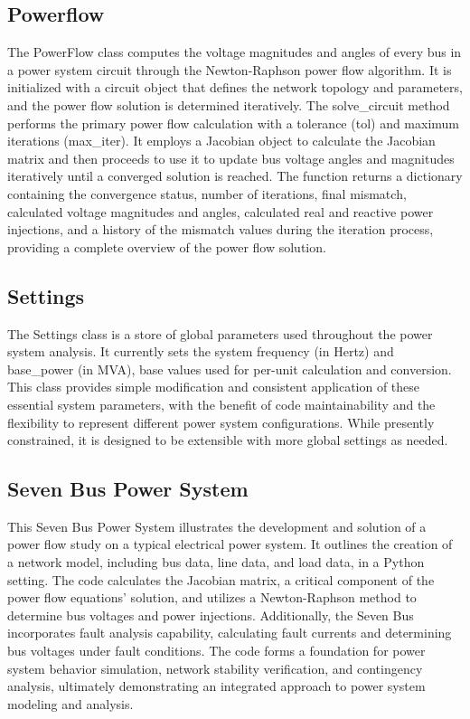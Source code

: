 \documentclass{article}
\begin{document}
	\subsection{Powerflow}
	The PowerFlow class computes the voltage magnitudes and angles of every bus in a power system circuit through the Newton-Raphson power flow algorithm. It is initialized with a circuit object that defines the network topology and parameters, and the power flow solution is determined iteratively. The solve\_circuit method performs the primary power flow calculation with a tolerance (tol) and maximum iterations (max\_iter). It employs a Jacobian object to calculate the Jacobian matrix and then proceeds to use it to update bus voltage angles and magnitudes iteratively until a converged solution is reached. The function returns a dictionary containing the convergence status, number of iterations, final mismatch, calculated voltage magnitudes and angles, calculated real and reactive power injections, and a history of the mismatch values during the iteration process, providing a complete overview of the power flow solution.
	
	\subsection{Settings}
	The Settings class is a store of global parameters used throughout the power system analysis. It currently sets the system frequency (in Hertz) and base\_power (in MVA), base values used for per-unit calculation and conversion. This class provides simple modification and consistent application of these essential system parameters, with the benefit of code maintainability and the flexibility to represent different power system configurations. While presently constrained, it is designed to be extensible with more global settings as needed.
	
	\subsection{Seven Bus Power System}
	This Seven Bus Power System illustrates the development and solution of a power flow study on a typical electrical power system. It outlines the creation of a network model, including bus data, line data, and load data, in a Python setting. The code calculates the Jacobian matrix, a critical component of the power flow equations' solution, and utilizes a Newton-Raphson method to determine bus voltages and power injections. Additionally, the Seven Bus incorporates fault analysis capability, calculating fault currents and determining bus voltages under fault conditions. The code forms a foundation for power system behavior simulation, network stability verification, and contingency analysis, ultimately demonstrating an integrated approach to power system modeling and analysis.
	
\end{document}
